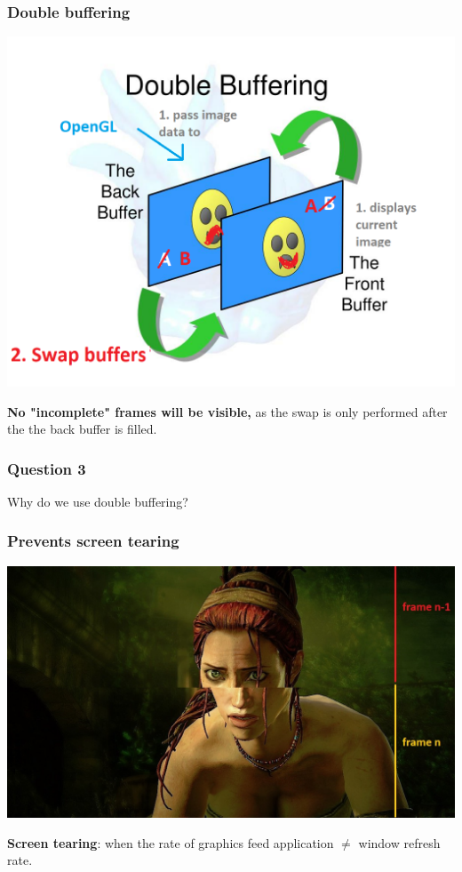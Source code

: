 \documentclass{beamer}
\begin{document}
\begin{frame}
    \frametitle{Double buffering}

    \begin{center}
        \includegraphics[scale=0.4]{q3-step2.png}
    \end{center}

    \textbf{No "incomplete" frames will be visible,} 
    as the swap is only performed after the the back buffer is filled.

\end{frame}

\begin{frame}
    \frametitle{Question 3}

    Why do we use double buffering?

\end{frame}

\begin{frame}
    \frametitle{Prevents screen tearing}

    \begin{center}
        \includegraphics[scale=0.3]{screen-tear.jpg}
    \end{center}

    \begin{tcolorbox}
        \textbf{Screen tearing}: 
        when the rate of graphics feed application $\neq$ window refresh rate.
    \end{tcolorbox}

\end{frame}
\end{document}

